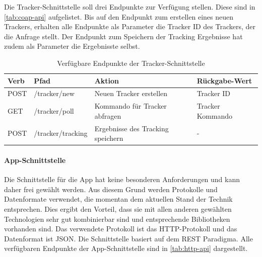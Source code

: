 Die Tracker-Schnittstelle soll drei Endpunkte zur Verfügung stellen.
Diese sind in \autoref{tab:coap-api} aufgelistet.
Bis auf den Endpunkt zum erstellen eines neuen Trackers, erhalten alle Endpunkte als Parameter die Tracker ID des Trackers, der die Anfrage stellt.
Der Endpunkt zum Speichern der Tracking Ergebnisse hat zudem als Parameter die Ergebnisste selbst.

\begin{table}[]
\begin{tabular}{l|l|l|l}
\textbf{Verb} & \textbf{Pfad}     & \textbf{Aktion}                   & \textbf{Rückgabe-Wert}    \\ \hline
POST          & /tracker/new      & Neuen Tracker erstellen           & Tracker ID \\ \hline
GET           & /tracker/poll     & Kommando für Tracker abfragen     & Tracker Kommando   \\ \hline
POST          & /tracker/tracking & Ergebnisse des Tracking speichern & -
\end{tabular}
\caption{\label{tab:coap-api}Verfügbare Endpunkte der Tracker-Schnittstelle}
\end{table}

\FloatBarrier
\paragraph{App-Schnittstelle}
Die Schnittstelle für die App hat keine besonderen Anforderungen und kann daher frei gewählt werden.
Aus diesem Grund werden Protokolle und Datenformate verwendet, die momentan dem aktuellen Stand der
Technik entsprechen. 
Dies ergibt den Vorteil, dass sie mit allen anderen gewählten Technologien sehr gut kombinierbar sind und entsprechende Bibliotheken vorhanden sind.
Das verwendete Protokoll ist das \gls{HTTP}-Protokoll und das Datenformat ist \gls{JSON}.
Die Schnittstelle basiert auf dem \gls{REST} Paradigma. 
Alle verfügbaren Endpunkte der App-Schnittstelle sind in \autoref{tab:http-api} dargestellt.

